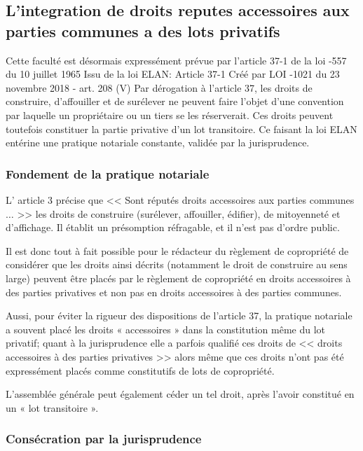 	\subsection{L’integration de droits reputes accessoires aux parties communes a des lots privatifs}
	
		Cette faculté est désormais expressément prévue par l’article 37-1 de la loi -557 du 10 juillet 1965
		Issu de la loi ELAN:
		Article 37-1 Créé par LOI -1021 du 23 novembre 2018 - art. 208 (V)
		Par dérogation à l'article 37, les droits de construire, d'affouiller et de surélever ne peuvent faire l'objet
		d'une convention par laquelle un propriétaire ou un tiers se les réserverait. Ces droits peuvent toutefois
		constituer la partie privative d'un lot transitoire.
		Ce faisant la loi ELAN entérine une pratique notariale constante, validée par la jurisprudence.
		
		\subsubsection{Fondement de la pratique notariale}
		
			L’ article 3 précise que << Sont réputés droits accessoires aux parties communes $\dots$ >> les droits de construire
			(surélever, affouiller, édifier), de mitoyenneté et d’affichage. Il établit un présomption réfragable, et il
			n’est pas d’ordre public.
			
			Il est donc tout à fait possible pour le rédacteur du règlement de copropriété de considérer que les droits
			ainsi décrits (notamment le droit de construire au sens large) peuvent être placés par le règlement de
			copropriété en droits accessoires à des parties privatives et non pas en droits accessoires à des parties
			communes.
			
			Aussi, pour éviter la rigueur des dispositions de l'article 37, la pratique notariale a souvent placé les droits
			« accessoires » dans la constitution même du lot privatif; quant à la jurisprudence elle a parfois qualifié
			ces droits de << droits accessoires à des parties privatives >> alors même que ces droits n'ont pas été
			expressément placés comme constitutifs de lots de copropriété.
			
			L’assemblée générale peut également céder un tel droit, après l’avoir constitué en un « lot transitoire ».
		
		\subsubsection{Consécration par la jurisprudence}
		
